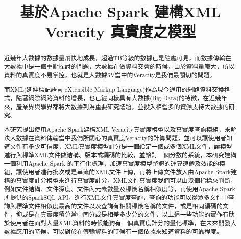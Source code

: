 \documentclass[a4paper]{article}
\title{基於Apache Spark 建構XML Veracity 真實度之模型}
\date{}
\begin{document}
\maketitle
\renewcommand{\abstractname}{中文摘要}
\begin{abstract}
近幾年大數據的數據量飛快地成長，超過TB等級的數據已是隨處可見，而數據傳輸在大數據中是一個重點探討的問題，大數據在做資料交會的時候，由於資料量龐大，所以資料的真實度不易掌控，也就是大數據5V當中的Veracity是我們最關切的問題。\\\par
而XML(延伸標記語言 eXtensible Markup Language)作為現今通用的網路資料交換格式，隨著網際網路資料的增長，也已經同樣具有大數據(Big Data)的特徵，在近幾年來，產業界與學界都將大數據列為重要研究議題，並投入相當多的資源支持大數據的研究。\\\par
本研究提出使用Apache Spark建構XML Veracity真實度模型以及真實度查詢模組，來解決大數據在資料傳輸當中我們所關心的真實度Veracity的計算問題，並可以讓使用者知道文件有多少可信度，XML真實度模型計分是一個給定一個或多個XML文件，讓模型進行與標準XML文件做結構、版本或編碼的比較，並給訂一個分數的系統，本研究建構一個利用Apache Spark 的平行化處理，加速真實度模型整體的運算速遞及效能的模組，讓使用者進行批次或是串流的XML文件上傳，再將上傳文件放入由Apache Spark建構的真實度計分模型來進行真實度計分，XML文件真實度我們可以由幾個指標來判斷，例如文件結構、文件深度、文件內元素數量及標籤名稱相似度等，再使用Apache Spark所提供的SparkSQL API，進行XML文件真實度查詢，查詢的功能可以從眾多文件中查詢與標準文件相似度最高的文件以及查詢有相關標籤名稱的文件，或是相同編碼的文件，抑或是在真實度積分當中同分或是相差多少分的文件，以上這一些功能的實作有助於使用者在面對大量XML資料的時候能狗有一個真實度計分的量化標準，在未來開發大數據應用的時候，可以對於在傳輸資料的時候有一個依據來知道資料的可靠程度。
\end{abstract}
\newpage
\tableofcontents
\newpage
\listoffigures
\newpage

\end{document}
